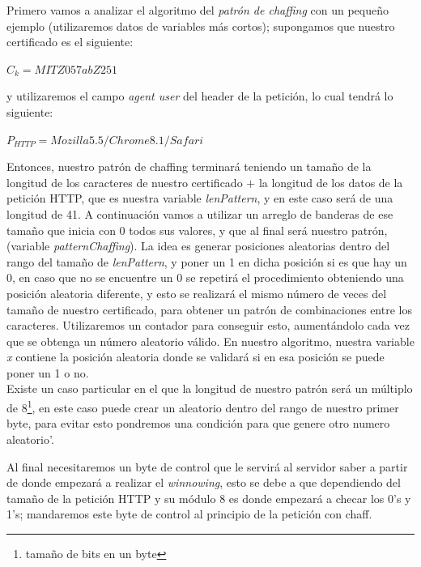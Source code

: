 \documentclass[12pt, a4paper, titlepage]{report}
\begin{document}
		   Primero vamos a analizar el algoritmo del \textit{patrón de chaffing} con un pequeño ejemplo (utilizaremos datos de variables más cortos); supongamos que nuestro certificado es el siguiente: 
		    \begin{center}
		        $C_k = MITZ057abZ251$
		    \end{center}
		    y utilizaremos el campo \textit{agent user} del header de la petición, lo cual tendrá lo siguiente:
		    \begin{center}
		        $P_{HTTP} = Mozilla5.5/Chrome8.1/Safari$
		    \end{center}
		    Entonces, nuestro patrón de chaffing terminará teniendo un tamaño de la longitud de los caracteres de nuestro certificado $+$ la longitud de los datos de la petición HTTP, que es nuestra variable \textit{lenPattern}, y en este caso será de una longitud de 41. A continuación vamos a utilizar un arreglo de banderas de ese tamaño que inicia con 0 todos sus valores, y que al final será nuestro patrón, (variable \textit{patternChaffing}). La idea es generar posiciones aleatorias dentro del rango del tamaño de \textit{lenPattern}, y poner un 1 en dicha posición si es que hay un 0, en caso que no se encuentre un 0 se repetirá el procedimiento obteniendo una posición aleatoria diferente, y esto se realizará el mismo número de veces del tamaño de nuestro certificado, para obtener un patrón de combinaciones entre los caracteres. Utilizaremos un contador para conseguir esto, aumentándolo cada vez que se obtenga un número aleatorio válido. En nuestro algoritmo, nuestra variable \textit{x} contiene la posición aleatoria donde se validará si en esa posición se puede poner un 1 o no.\\
		    
		    Existe un caso particular en el que la longitud de nuestro patrón será un múltiplo de 8\footnote{tamaño de bits en un byte}, en este caso puede crear un aleatorio dentro del rango de nuestro primer byte, para evitar esto pondremos una condición para que genere otro numero aleatorio'.  
		    
		    Al final necesitaremos un byte de control que le servirá al servidor saber a partir de donde empezará a realizar el \textit{winnowing}, esto se debe a que dependiendo del tamaño de la petición HTTP y su módulo 8 es donde empezará a checar los 0's y 1's; mandaremos este byte de control al principio de la petición con chaff.\\
		    
\end{document}
